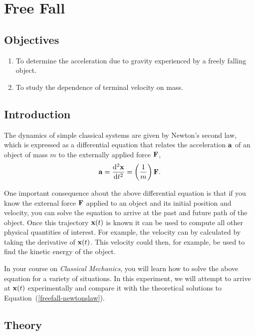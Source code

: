 \chapter{Free Fall}

\section*{Objectives}

\begin{enumerate}
\item To determine the acceleration due to gravity experienced by a freely falling object.
\item To study the dependence of terminal velocity on mass.
\end{enumerate}

\section*{Introduction}

The dynamics of simple classical systems are given by Newton's second law, which is expressed as a differential equation that relates the acceleration $\vb{a}$ of an object of mass $m$ to the externally applied force $\vb{F}$,
\begin{equation}
    \vb{a} = \dv[2]{\vb{x}}{t} = \left(\frac{1}{m}\right) \vb{F}.
    \label{freefall-newtonslaw}
\end{equation}

One important consequence about the above differential equation is that if you know the external force $\vb{F}$ applied to an object and its initial position and velocity, you can solve the equation to arrive at the past and future path of the object. Once this trajectory $\vb{x}(t)$ is known it can be used to compute all other physical quantities of interest. For example, the velocity can by calculated by taking the derivative of $\vb{x}(t)$. This velocity could then, for example, be used to find the kinetic energy of the object.

In your course on \textsl{Classical Mechanics}, you will learn how to solve the above equation for a variety of situations. In this experiment, we will attempt to arrive at $\vb{x}(t)$ experimentally and compare it with the theoretical solutions to Equation~(\ref{freefall-newtonslaw}).


\section*{Theory}


